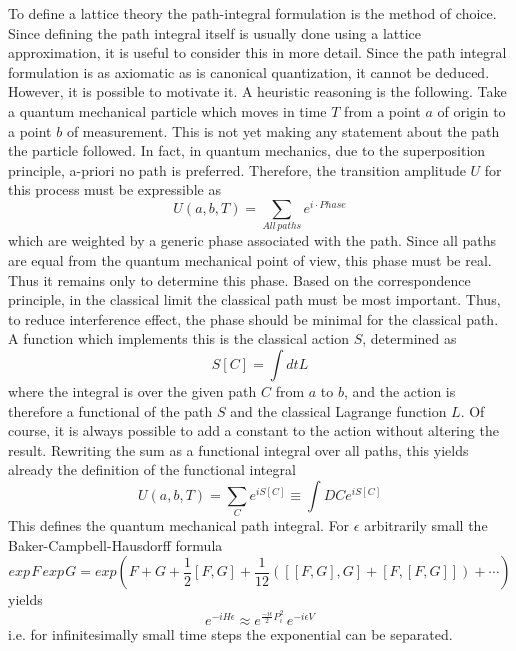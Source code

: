 \documentclass[preprint,12pt]{elsarticle}
\begin{document}
To define a lattice theory the path-integral formulation is the method of choice. Since
defining the path integral itself is usually done using a lattice approximation, it is useful
to consider this in more detail. Since the path integral formulation is as axiomatic as is canonical quantization, it cannot be deduced. However, it is possible to motivate it. A heuristic reasoning is the following. Take a quantum mechanical particle which moves in time $T$ from a point $a$ of origin to a point $b$ of measurement. This is not yet making any statement about the path the particle followed. In fact, in quantum mechanics, due to the superposition principle, a-priori no path is preferred. Therefore, the transition amplitude $U$ for this process must be expressible as
\begin{equation}
U(a, b, T) = \sum_{All\hspace{2pt}paths}e^{i\cdot Phase}
\end{equation}
which are weighted by a generic phase associated with the path. Since all paths are equal from the quantum mechanical point of view, this phase must be real. Thus it remains only to determine this phase. Based on the correspondence principle, in the classical limit the classical path must be most important. Thus, to reduce interference effect, the phase should be minimal for the classical path. A function which implements this is the classical action $S$, determined as
\begin{equation}
S[C] = \int dtL
\end{equation}
where the integral is over the given path $C$ from $a$ to $b$, and the action is therefore a functional of the path $S$ and the classical Lagrange function $L$. Of course, it is always possible to add a constant to the action without altering the result. Rewriting the sum as a functional integral over all paths, this yields already the definition of the functional integral
\begin{equation}
U(a, b, T) = \sum_{C}e^{iS[C]} \equiv \int DCe^{iS[C]}
\end{equation}
This defines the quantum mechanical path integral. For $\epsilon$ arbitrarily small the Baker-Campbell-Hausdorff formula
\begin{equation}
exp\hspace{1pt}F\hspace{2pt}exp\hspace{1pt}G = exp(F + G + \frac{1}{2}[F, G] + \frac{1}{12}([[F, G], G] + [F, [F, G]]) + \cdots)
\end{equation}
yields
\begin{equation}
e^{-iH\epsilon} \approx e^{\frac{-i \epsilon}{2}P^{2}_{i}} \hspace{2pt} e^{-i \epsilon V}
\end{equation}
i.e. for infinitesimally small time steps the exponential can be separated.
\end{document}
